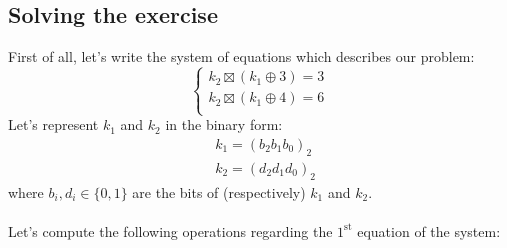 \documentclass[11pt, a4paper]{article}
\begin{document}
\subsection{Solving the exercise}
First of all, let's write the system of equations which describes our problem:
\begin{equation*}
    \begin{cases}
        k_2\boxtimes(k_1\oplus3)=3\\
        k_2\boxtimes(k_1\oplus4)=6\\
    \end{cases}
\end{equation*}
Let's represent $k_1$ and $k_2$ in the binary form:
\begin{align*}
    &k_1=(b_2b_1b_0)_2\\
    &k_2=(d_2d_1d_0)_2
\end{align*}
where $b_i,d_i\in\{0,1\}$ are the bits of (respectively) $k_1$ and $k_2$.\\\\
Let's compute the following operations regarding the $1^{\text{st}}$ equation of the system:
\end{document}
